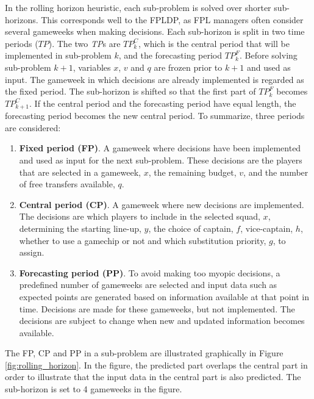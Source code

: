 \newpar

In the rolling horizon heuristic, each sub-problem is solved over shorter sub-horizons. This corresponds well to the FPLDP, as FPL managers often consider several gameweeks when making decisions. Each sub-horizon is split in two time periods ($TP$). The two \textit{TP}s are $TP_k^{C}$, which is the central period that will be implemented in sub-problem $k$, and the forecasting period $TP_k^{F}$. Before solving sub-problem $k+1$, variables $x$, $v$ and $q$ are frozen prior to $k+1$ and used as input. The gameweek in which decisions are already implemented is regarded as the fixed period. The sub-horizon is shifted so that the first part of $TP_k^{F}$ becomes $TP_{k+1}^{C}$. If the central period and the forecasting period have equal length, the forecasting period becomes the new central period. To summarize, three periods are considered:

\begin{enumerate}[label=(\roman*)]
    \item \textbf{Fixed period (FP)}. A gameweek where decisions have been implemented and used as input for the next sub-problem. These decisions are the players that are selected in a gameweek, $x$, the remaining budget, $v$, and the number of free transfers available, $q$.
    \item \textbf{Central period (CP)}. A gameweek where new decisions are implemented. The decisions are which players to include in the selected squad, $x$, determining the starting line-up, $y$, the choice of captain, $f$,  vice-captain, $h$, whether to use a gamechip or not and which substitution priority, $g$, to assign.  
    \item \textbf{Forecasting period (PP)}. To avoid making too myopic decisions, a predefined number of gameweeks are selected and input data such as expected points are generated based on information available at that point in time. Decisions are made for these gameweeks, but not implemented.  The decisions are subject to change when new and updated information becomes available. 
\end{enumerate}

The FP, CP and PP in a sub-problem are illustrated graphically in Figure \ref{fig:rolling_horizon}. In the figure, the predicted part overlaps the central part in order to illustrate that the input data in the central part is also predicted. The sub-horizon is set to 4 gameweeks in the figure. 

